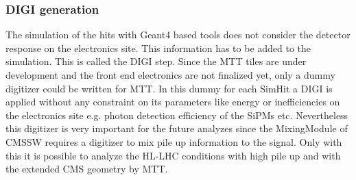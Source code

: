 		\subsubsection{DIGI generation}
			The simulation of the hits with Geant4 based tools does not consider the detector response on the electronics site.
			This information has to be added to the simulation.
			This is called the DIGI step.
			Since the MTT tiles are under development and the front end electronics are not finalized yet, only a dummy digitizer could be written for MTT.
			In this dummy for each SimHit a DIGI is applied without any constraint on its parameters like energy or inefficiencies on the electronics site e.g. photon detection efficiency of the SiPMs etc.
			Nevertheless this digitizer is very important for the future analyzes since the MixingModule of CMSSW requires a digitizer to mix pile up information to the signal.
			Only with this it is possible to analyze the HL-LHC conditions with high pile up and with the extended CMS geometry by MTT.
